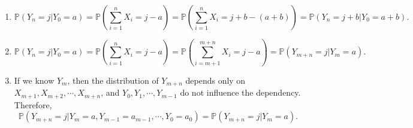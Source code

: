 \documentclass{huhtakm-template-book-v2}
\newcommand{\prob}{\mathbb{P}}
\begin{document}
    \begin{proofing}
        \begin{enumerate}
            \item 
            \begin{equation*}
                \prob(Y_{n} = j|Y_{0} = a) = \prob\left(\sum_{i = 1}^{n}X_{i} = j-a\right) = \prob\left(\sum_{i = 1}^{n}X_{i} = j+b-(a+b)\right) = \prob(Y_{n} = j+b|Y_{0} = a+b).
            \end{equation*}
            \item 
            \begin{equation*}
                \prob(Y_{n} = j|Y_{0} = a) = \prob\left(\sum_{i = 1}^{n}X_{i} = j-a\right) = \prob\left(\sum_{i = m+1}^{m+n}X_{i} = j-a\right) = \prob(Y_{m+n} = j|Y_{m} = a).
            \end{equation*}
            \item If we know $Y_{m}$, then the distribution of $Y_{m+n}$ depends only on $X_{m+1},X_{m+2},\cdots,X_{m+n}$, and $Y_{0},Y_{1},\cdots,Y_{m-1}$ do not influence the dependency.
            Therefore,
            \begin{equation*}
                \prob(Y_{m+n} = j|Y_{m} = a,Y_{m-1} = a_{m-1},\cdots,Y_{0} = a_{0}) = \prob(Y_{m+n} = j|Y_{m} = a).
            \end{equation*}
        \end{enumerate}
    \end{proofing}
    \newpage
\end{document}
